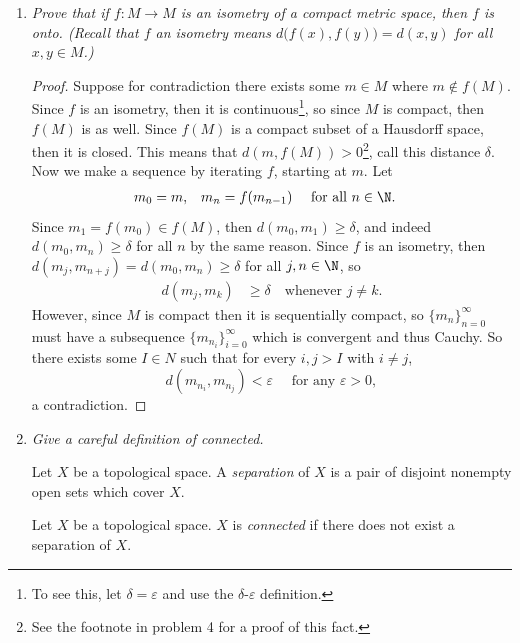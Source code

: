 \documentclass[12pt,letterpaper]{article}
\begin{document}
\begin{enumerate}
\pagebreak
\item \textit{Prove that if $f:M\to M$ is an isometry of a compact metric space, then $f$ is onto. (Recall that $f$ an isometry means $d\big(f(x), f(y)\big)=d(x,y)$ for all $x,y\in M$.)}
\begin{proof}
Suppose for contradiction there exists some $m\in M$ where $m\not\in f(M)$. Since $f$ is an isometry, then it is continuous\footnote{To see this, let $\delta=\varepsilon$ and use the $\delta$-$\varepsilon$ definition.}, so since $M$ is compact, then $f(M)$ is as well. Since $f(M)$ is a compact subset of a Hausdorff space, then it is closed. This means that $d(m,f(M))>0$\footnote{See the footnote in problem 4 for a proof of this fact.}, call this distance $\delta$. Now we make a sequence by iterating $f$, starting at $m$. Let 
\begin{align*}
m_0&=m, &m_n&=f(m_{n-1}) \quad \text{ for all } n\in\N.
\end{align*}
Since $m_1=f(m_0)\in f(M)$, then $d(m_0,m_1)\geq\delta$, and indeed $d(m_0,m_n)\geq\delta$ for all $n$ by the same reason. Since $f$ is an isometry, then $d(m_j,m_{n+j})=d(m_0,m_{n})\geq \delta$ for all $j,n\in\N$, so 
\begin{align*}
d(m_j,m_k)&\geq\delta \quad \text{whenever } j\neq k.
\end{align*}
However, since $M$ is compact then it is sequentially compact, so $\{m_n\}_{n=0}^\infty$ must have a subsequence $\{m_{n_i}\}_{i=0}^\infty$ which is convergent and thus Cauchy. So there exists some $I\in N$ such that for every $i,j>I$ with $i\neq j$, 
$$d(m_{n_i},m_{n_j})<\varepsilon \quad \text{ for any }\varepsilon>0,$$
a contradiction. 

\end{proof}

\vfill
\pagebreak
\item \textit{Give a careful definition of \emph{connected}. }
\begin{definition*}
Let $X$ be a topological space. A \emph{separation} of $X$ is a pair of disjoint nonempty open sets which cover $X$. 
\end{definition*}
\begin{definition*}
Let $X$ be a topological space. $X$ is \emph{connected} if there does not exist a separation of $X$.%
\end{definition*}


\end{enumerate}
\end{document}
